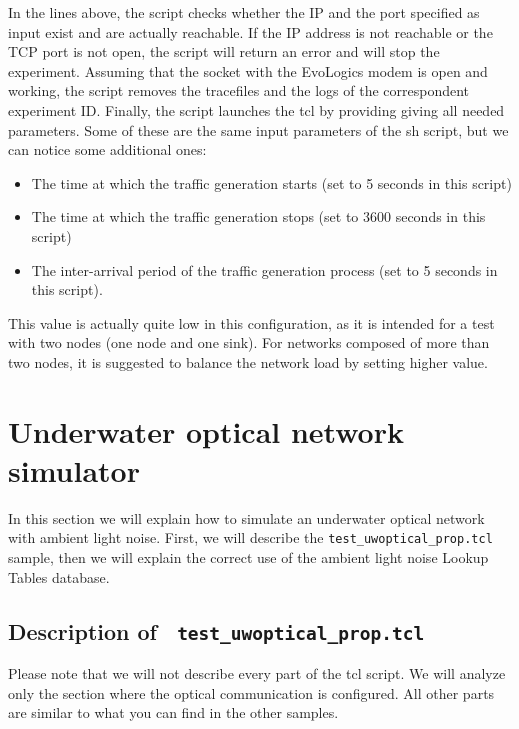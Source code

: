 \documentclass[11pt]{article}
\begin{document}
In the lines above, the script checks whether the IP and the port specified as input exist and are actually reachable. If the IP address is not reachable or the TCP port is not open, the script will return an error and will stop the experiment. 
Assuming that the socket with the EvoLogics modem is open and working, the script removes the tracefiles and the logs of the correspondent experiment ID. Finally, the script launches the tcl by providing giving all needed parameters. Some of these are the same input parameters of the sh script, but we can notice some additional ones:
\begin{itemize}
\item The time at which the traffic generation starts (set to 5 seconds in this script)
\item The time at which the traffic generation stops (set to 3600 seconds in this script)
\item The inter-arrival period of the traffic generation process (set to 5 seconds in this script).
\end{itemize}
This value is actually quite low in this configuration, as it is intended for a test with two nodes (one node and one sink). For networks composed of more than two nodes, it is suggested to balance the network load by setting higher value.

\clearpage
\section{Underwater optical network simulator}
\label{sec:optical}
In this section we will explain how to simulate an underwater optical network with ambient light noise. First, we will describe the {\tt test\_uwoptical\_prop.tcl} sample, then we will explain the correct use of the ambient light noise Lookup Tables database.
\subsection{Description of  \ {\tt test\_uwoptical\_prop.tcl}}
Please note that we will not describe every part of the tcl script. We will analyze only the section where the optical communication is configured. All other parts are similar to what you can find in the other samples.
\end{document}
